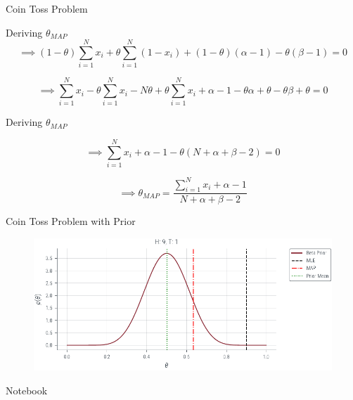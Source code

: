 \documentclass{beamer}
\begin{document}
\begin{section}{Coin Toss Problem}
\begin{frame}{Deriving $\theta_{MAP}$}
        \begin{equation*}
            \implies (1 - \theta) \sum_{i = 1}^{N} x_i + \theta \sum_{i = 1}^{N} (1 - x_i) + (1 - \theta) (\alpha - 1) - \theta (\beta - 1) = 0
        \end{equation*}

        \begin{equation*}
            \implies \sum_{i = 1}^{N} x_i - \theta \sum_{i = 1}^{N} x_i - N \theta + \theta \sum_{i = 1}^{N} x_i + \alpha - 1 - \theta \alpha  + \theta - \theta \beta + \theta = 0
        \end{equation*}

    \end{frame}

    \begin{frame}{Deriving $\theta_{MAP}$}

        \begin{equation*}
            \implies \sum_{i = 1}^{N} x_i + \alpha - 1 - \theta ( N + \alpha + \beta - 2) = 0
        \end{equation*}

        \begin{equation*}
            \implies \theta_{MAP} = \frac{\sum_{i = 1}^{N} x_i + \alpha - 1}{N + \alpha + \beta - 2}
        \end{equation*}
    \end{frame}

    \begin{frame}{Coin Toss Problem with Prior}
        \begin{figure}
            \centerline{\includegraphics[scale = 0.75]{../figures/map/coin_toss_prior_mle_map.pdf}}
        \end{figure}

    Notebook
    \end{frame}
\end{section}


\end{document}
